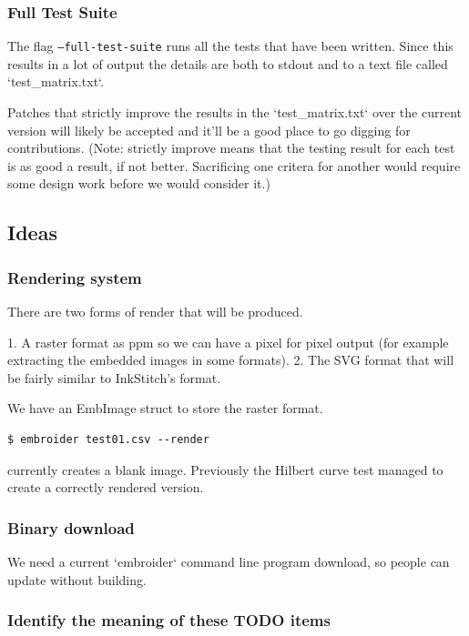 \documentclass[a4paper, 11pt]{report}
\begin{document}
\subsubsection{Full Test Suite}

The flag \texttt{--full-test-suite} runs all the tests that have been written.
Since this results in a lot of output the details are both to stdout
and to a text file called `test\_matrix.txt`.

Patches that strictly improve the results in the `test\_matrix.txt` over
the current version will likely be accepted and it'll be a good place
to go digging for contributions. (Note: strictly improve means that
the testing result for each test is as good a result, if not better.
Sacrificing one critera for another would require some design work
before we would consider it.)

\subsection{Ideas}

\subsubsection{Rendering system}

There are two forms of render that will be produced.

1. A raster format as ppm so we can have a pixel for pixel output (for example extracting the embedded images in some formats).
2. The SVG format that will be fairly similar to InkStitch's format.

We have an EmbImage struct to store the raster format.

\begin{verbatim}
$ embroider test01.csv --render
\end{verbatim}

currently creates a blank image. Previously the Hilbert curve test managed to
create a correctly rendered version.

\subsubsection{Binary download}

We need a current `embroider` command line program download, so people can update
without building.

\subsubsection{Identify the meaning of these TODO items}
\end{document}
